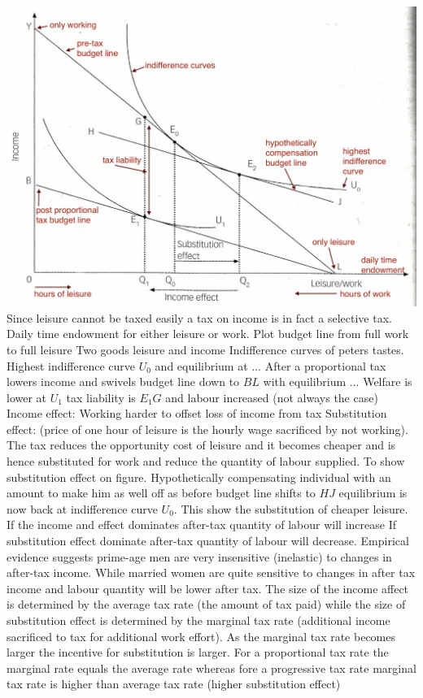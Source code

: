 \documentclass[12pt]{examnotes}
\begin{document}
\includegraphics[scale=0.4]{./imgs/121.jpg}
\ra Since leisure cannot be taxed easily a tax on income is in fact a selective tax.
\ra Daily time endowment for either leisure or work. 
\ra Plot budget line from full work to full leisure
\ra Two goods leisure and income
\ra Indifference curves of peters tastes.
\ra Highest indifference curve $U_0$ and equilibrium at ...
\ra After a proportional tax lowers income and swivels budget line down to $BL$ with equilibrium ...
\ra Welfare is lower at $U_1$ tax liability is $E_1G$ and labour increased (not always the case)
\ra Income effect: Working harder to offset loss of income from tax
\ra Substitution effect: (price of one hour of leisure is the hourly wage sacrificed by not working). The tax reduces the opportunity cost of leisure and it becomes cheaper and is hence substituted for work and reduce the quantity of labour supplied.
\ra To show substitution effect on figure. Hypothetically compensating individual with an amount to make him as well off as before budget line shifts to $HJ$ equilibrium is now back at indifference curve $U_0$. This show the substitution of cheaper leisure.
\ra If the income and effect dominates after-tax quantity of labour will increase
\ra If substitution effect dominate after-tax quantity of labour will decrease.
\ra Empirical evidence suggests prime-age men are very insensitive (inelastic) to changes in after-tax income. While married women are quite sensitive to changes in after tax income and labour quantity will be lower after tax.
\ra The size of the income affect is determined by the average tax rate (the amount of tax paid) while the size of substitution effect is determined by the marginal tax rate (additional income sacrificed to tax for additional work effort). As the marginal tax rate becomes larger the incentive for substitution is larger.
\ra For a proportional tax rate the marginal rate equals the average rate whereas fore a progressive tax rate marginal tax rate is higher than average tax rate (higher substitution effect)
\end{document}
